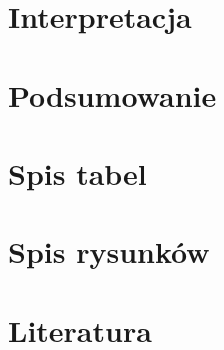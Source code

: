 \documentclass{article}
\begin{document}
\section{Interpretacja}

\section{Podsumowanie}

\newpage
\section{Spis tabel}
\renewcommand\listtablename{}
\listoftables


\newpage
\section{Spis rysunków}
\renewcommand\listfigurename{}
\listoffigures


\newpage
\section{Literatura}
\printbibliography[heading=none]
\end{document}

